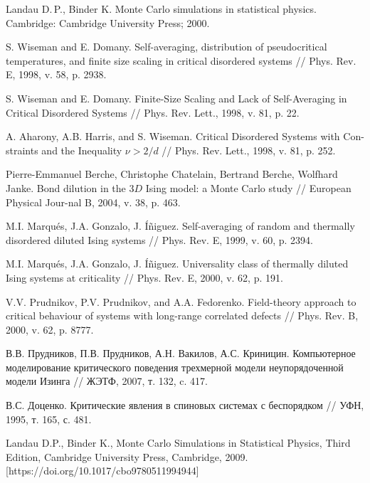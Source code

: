 \begin{thebibliography}{111}
Landau D.\,P., Binder K.
Monte Carlo simulations in statistical physics. Cambridge: Cambridge University Press; 2000.




S. Wiseman and E. Domany. Self-averaging, distribution of pseudocritical temperatures, and finite size scaling in critical disordered systems // Phys. Rev. E, 1998, v. 58, p. 2938.

S. Wiseman and E. Domany. Finite-Size Scaling and Lack of Self-Averaging in Critical Disordered Systems // Phys. Rev. Lett., 1998, v. 81, p. 22.

A. Aharony, A.B. Harris, and S. Wiseman. Critical Disordered Systems with Con-straints and the Inequality $\nu > 2/d$  // Phys. Rev. Lett., 1998, v. 81,  p. 252.

Pierre-Emmanuel Berche, Christophe Chatelain, Bertrand Berche, Wolfhard Janke. Bond dilution in the $3D$ Ising model: a Monte Carlo study // European Physical Jour-nal B, 2004, v. 38, p. 463.

M.I. Marqués, J.A. Gonzalo, J. Íñiguez. Self-averaging of random and thermally disordered diluted Ising systems // Phys. Rev. E, 1999, v. 60, p. 2394.

M.I. Marqués, J.A. Gonzalo, J. Íñiguez. Universality class of thermally diluted Ising systems at criticality // Phys. Rev. E, 2000, v. 62, p. 191.

V.V. Prudnikov, P.V. Prudnikov, and A.A. Fedorenko. Field-theory approach to critical behaviour of systems with long-range correlated defects // Phys. Rev. B, 2000, v. 62, p. 8777.

В.В. Прудников, П.В. Прудников, А.Н. Вакилов, А.С. Криницин. Компьютерное моделирование критического поведения трехмерной модели неупорядоченной модели Изинга // ЖЭТФ, 2007, т. 132, c. 417.

В.С. Доценко. Критические явления в спиновых системах с беспорядком // УФН, 1995, т. 165, с. 481.








Landau D.P., Binder K., Monte Carlo Simulations in Statistical Physics, Third Edition, Cambridge University Press, Cambridge, 2009. [https://doi.org/10.1017/cbo9780511994944]


\end{thebibliography}
